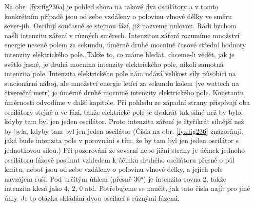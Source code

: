     Na obr. \ref{fyz:fig236a} je pohled shora na takové dva oscilátory a v tomto konkrétním případě 
    jsou od sebe vzdáleny o polovinu vlnové délky ve směru sever-jih. Oscilují současně se stejnou 
    fází, již nazveme nulovou. Rádi bychom našli intenzitu záření v různých směrech. Intenzitou 
    záření rozumíme množství energie nesené polem za sekundu, úměrné druhé mocnině časové střední 
    hodnoty intenzity elektrického pole. Takže to, co máme hledat, chceme-li vědět, jak je světlo 
    jasné, je druhá mocnina intenzity elektrického pole, nikoli samotná intenzita pole. Intenzita 
    elektrického pole nám udává velikost síly působící na stacionární náboj, ale množství energie 
    letící za sekundu kolem (ve wattech na čtvereční metr) je úměrné druhé mocnině intenzity 
    elektrického pole. Konstantu úměrnosti odvodíme v další kapitole. Při pohledu ze západní strany 
    přispívají oba oscilátory stejně a ve fázi, takže elektrické pole je dvakrát tak silné než by 
    bylo, kdyby tam byl jen jeden oscilátor. Proto intenzita záření je čtyřikrát silnější než by 
    byla, kdyby tam byl jen jeden oscilátor (Čísla na obr. \ref{fyz:fig236} znázorňují, jaká bude 
    intenzita pole v porovnání s tím, že by tam byl jen jeden oscilátor s jednotkovou silou.) Při 
    pozorování ze severní nebo jižní strany je účinek jednoho oscilátoru fázově posunut vzhledem k 
    účinku druhého oscilátoru přesně o půl kmitu, neboť jsou od sebe vzdáleny o polovinu vlnové 
    délky, a jejich pole navzájem ruší. Pod určitým úhlem (přesně \ang{30}) je intenzita rovna 
    \(2\), takže intenzita klesá jako \(4\), \(2\), \(0\) atd. Potřebujeme se naučit, jak tato 
    čísla najít pro jiné úhly. Je to otázka skládání dvou oscilací s různými fázemi.
    
